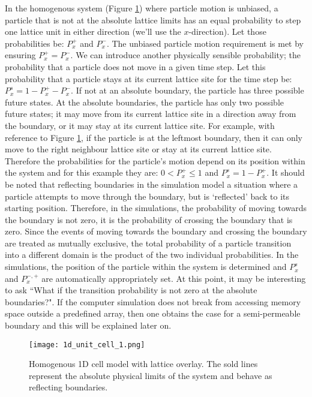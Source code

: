	In the homogenous system (Figure \ref{fig:1d_unit_cell_1.png}) where particle motion is unbiased, a particle that is not at the absolute lattice limits has an equal probability to step one lattice unit in either direction (we'll use the $ x $-direction). Let those probabilities be: $ P_x^+ $ and $ P_x^- $. The unbiased particle motion requirement is met by ensuring $ P_x^+ = P_x^- $. We can introduce another physically sensible probability; the probability that a particle does not move in a given time step. Let this probability that a particle stays at its current lattice site for the time step be: $ P_x^s = 1 - P_x^+ - P_x^- $. If not at an absolute boundary, the particle has three possible future states. At the absolute boundaries, the particle has only two possible future states; it may move from its current lattice site in a direction away from the boundary, or it may stay at its current lattice site. For example, with reference to Figure \ref{fig:1d_unit_cell_1.png}, if the particle is at the leftmost boundary, then it can only move to the right neighbour lattice site or stay at its current lattice site. Therefore the probabilities for the particle's motion depend on its position within the system and for this example they are: $ 0 < P_x^+ \leq 1 $ and $ P_x^s = 1 - P_x^+ $. It should be noted that reflecting boundaries in the simulation model a situation where a particle attempts to move through the boundary, but is `reflected' back to its starting position. Therefore, in the simulations, the probability of moving towards the boundary is not zero, it is the probability of crossing the boundary that is zero. Since the events of moving towards the boundary and crossing the boundary are treated as mutually exclusive, the total probability of a particle transition into a different domain is the product of the two individual probabilities. In the simulations, the position of the particle within the system is determined and $ P_x^s $ and $ P_x^{-,+} $ are automatically appropriately set. At this point, it may be interesting to ask ``What if the transition probability is not zero at the absolute boundaries?". If the computer simulation does not break from accessing memory space outside a predefined array, then one obtains the case for a semi-permeable boundary and this will be explained later on.
	
	\begin{figure}[h]
		\centering
		\texttt{[image: 1d\_unit\_cell\_1.png]}
		\caption[Homogenous 1D cell model]{Homogenous 1D cell model with lattice overlay. The sold lines represent the absolute physical limits of the system and behave as reflecting boundaries.}
		\label{fig:1d_unit_cell_1.png}
		\end{figure}	
	
